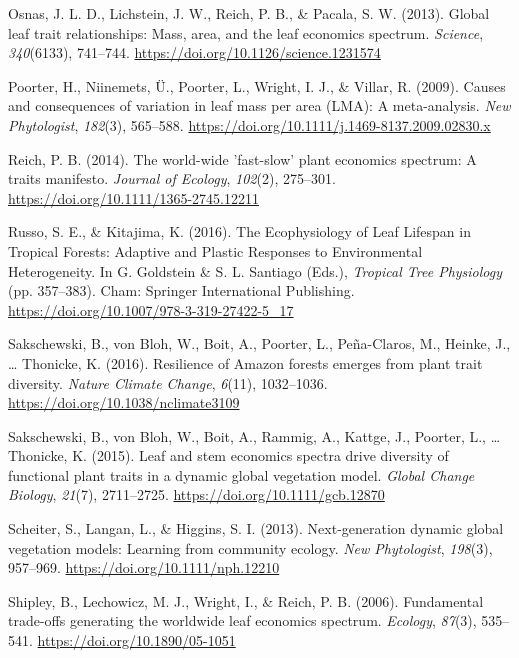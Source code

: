 \documentclass[
  12pt,
  letterpaper,
  DIV=11,
  numbers=noendperiod]{scrartcl}
\newlength{\cslhangindent}
\newlength{\cslentryspacingunit} %
\newenvironment{CSLReferences}[2] %
 {%
  \setlength{\parindent}{0pt}
  \ifodd #1
  \let\oldpar\par
  \def\par{\hangindent=\cslhangindent\oldpar}
  \fi
  \setlength{\parskip}{#2\cslentryspacingunit}
 }%
 {}
\begin{document}
\begin{CSLReferences}{1}{0}
\leavevmode{}%
Osnas, J. L. D., Lichstein, J. W., Reich, P. B., \& Pacala, S. W.
(2013). Global leaf trait relationships: {Mass}, area, and the leaf
economics spectrum. \emph{Science}, \emph{340}(6133), 741--744.
\url{https://doi.org/10.1126/science.1231574}

\leavevmode{}%
Poorter, H., Niinemets, Ü., Poorter, L., Wright, I. J., \& Villar, R.
(2009). Causes and consequences of variation in leaf mass per area
({LMA}): {A} meta-analysis. \emph{New Phytologist}, \emph{182}(3),
565--588. \url{https://doi.org/10.1111/j.1469-8137.2009.02830.x}

\leavevmode{}%
Reich, P. B. (2014). The world-wide 'fast-slow' plant economics
spectrum: {A} traits manifesto. \emph{Journal of Ecology},
\emph{102}(2), 275--301. \url{https://doi.org/10.1111/1365-2745.12211}

\leavevmode{}%
Russo, S. E., \& Kitajima, K. (2016). The {Ecophysiology} of {Leaf
Lifespan} in {Tropical Forests}: {Adaptive} and {Plastic Responses} to
{Environmental Heterogeneity}. In G. Goldstein \& S. L. Santiago (Eds.),
\emph{Tropical {Tree Physiology}} (pp. 357--383). {Cham}: {Springer
International Publishing}.
\url{https://doi.org/10.1007/978-3-319-27422-5_17}

\leavevmode{}%
Sakschewski, B., von Bloh, W., Boit, A., Poorter, L., Peña-Claros, M.,
Heinke, J., \ldots{} Thonicke, K. (2016). Resilience of {Amazon} forests
emerges from plant trait diversity. \emph{Nature Climate Change},
\emph{6}(11), 1032--1036. \url{https://doi.org/10.1038/nclimate3109}

\leavevmode{}%
Sakschewski, B., von Bloh, W., Boit, A., Rammig, A., Kattge, J.,
Poorter, L., \ldots{} Thonicke, K. (2015). Leaf and stem economics
spectra drive diversity of functional plant traits in a dynamic global
vegetation model. \emph{Global Change Biology}, \emph{21}(7),
2711--2725. \url{https://doi.org/10.1111/gcb.12870}

\leavevmode{}%
Scheiter, S., Langan, L., \& Higgins, S. I. (2013). Next-generation
dynamic global vegetation models: {Learning} from community ecology.
\emph{New Phytologist}, \emph{198}(3), 957--969.
\url{https://doi.org/10.1111/nph.12210}

\leavevmode{}%
Shipley, B., Lechowicz, M. J., Wright, I., \& Reich, P. B. (2006).
Fundamental trade-offs generating the worldwide leaf economics spectrum.
\emph{Ecology}, \emph{87}(3), 535--541.
\url{https://doi.org/10.1890/05-1051}


\end{CSLReferences}
\end{document}
